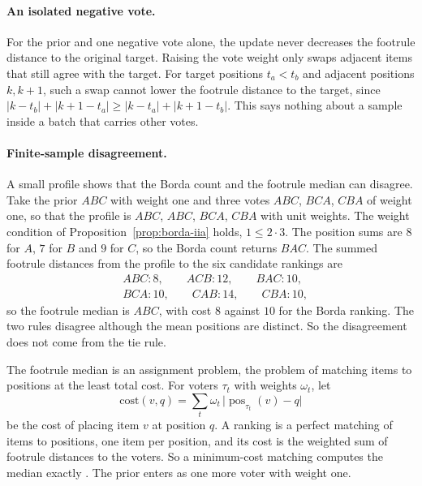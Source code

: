 \paragraph{An isolated negative vote.} For the prior and one negative vote alone, the update never decreases the footrule distance to the original target. Raising the vote weight only swaps adjacent items that still agree with the target. For target positions $t_a<t_b$ and adjacent positions $k,k+1$, such a swap cannot lower the footrule distance to the target, since $|k-t_b|+|k+1-t_a|\ge|k-t_a|+|k+1-t_b|$. This says nothing about a sample inside a batch that carries other votes.

\paragraph{Finite-sample disagreement.}
A small profile shows that the Borda count and the footrule median can disagree. Take the prior $ABC$ with weight one and three votes $ABC$, $BCA$, $CBA$ of weight one, so that the profile is $ABC$, $ABC$, $BCA$, $CBA$ with unit weights. The weight condition of Proposition~\ref{prop:borda-iia} holds, $1\le 2\cdot 3$. The position sums are $8$ for $A$, $7$ for $B$ and $9$ for $C$, so the Borda count returns $BAC$. The summed footrule distances from the profile to the six candidate rankings are
\[
\begin{aligned}
&ABC\colon 8,\qquad ACB\colon 12,\qquad BAC\colon 10,\\
&BCA\colon 10,\qquad CAB\colon 14,\qquad CBA\colon 10,
\end{aligned}
\]
so the footrule median is $ABC$, with cost $8$ against $10$ for the Borda ranking. The two rules disagree although the mean positions are distinct. So the disagreement does not come from the tie rule.

The footrule median is an assignment problem, the problem of matching items to positions at the least total cost. For voters $\tau_t$ with weights $\omega_t$, let
\[
\mathrm{cost}(v,q)=\sum_t\omega_t\,\bigl|\operatorname{pos}_{\tau_t}(v)-q\bigr|
\]
be the cost of placing item $v$ at position $q$. A ranking is a perfect matching of items to positions, one item per position, and its cost is the weighted sum of footrule distances to the voters. So a minimum-cost matching computes the median exactly \citep{dwork2001rank}. The prior enters as one more voter with weight one.

